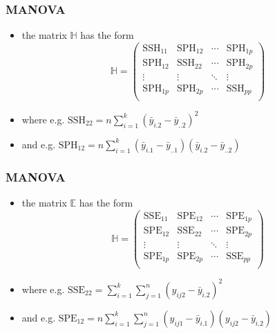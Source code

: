 \begin{frame}\frametitle{MANOVA}
  \begin{itemize}
  \item the matrix $\mathbb{H}$ has the form
    \begin{displaymath}
      \mathbb{H} = \begin{pmatrix} 
        \mathrm{SSH}_{11} & \mathrm{SPH}_{12} & \cdots & \mathrm{SPH}_{1p} \\    
        \mathrm{SPH}_{12} & \mathrm{SSH}_{22} & \cdots & \mathrm{SPH}_{2p} \\    
        \vdots & \vdots & \ddots & \vdots \\    
        \mathrm{SPH}_{1p} & \mathrm{SPH}_{2p} & \cdots & \mathrm{SSH}_{pp} \\    
      \end{pmatrix}
    \end{displaymath}
  \item where e.g. $\mathrm{SSH}_{22} = n \sum_{i=1}^k (\bar{y}_{i.2} - \bar{y}_{..2})^2$
  \item and e.g. $\mathrm{SPH}_{12} = n \sum_{i=1}^k (\bar{y}_{i.1} - \bar{y}_{..1})(\bar{y}_{i.2} - \bar{y}_{..2})$
  \end{itemize}
\end{frame}


\begin{frame}\frametitle{MANOVA}
  \begin{itemize}
  \item the matrix $\mathbb{E}$ has the form
    \begin{displaymath}
      \mathbb{H} = \begin{pmatrix} 
        \mathrm{SSE}_{11} & \mathrm{SPE}_{12} & \cdots & \mathrm{SPE}_{1p} \\    
        \mathrm{SPE}_{12} & \mathrm{SSE}_{22} & \cdots & \mathrm{SPE}_{2p} \\    
        \vdots & \vdots & \ddots & \vdots \\    
        \mathrm{SPE}_{1p} & \mathrm{SPE}_{2p} & \cdots & \mathrm{SSE}_{pp} \\    
      \end{pmatrix}
    \end{displaymath}
  \item where e.g. $\mathrm{SSE}_{22} =  \sum_{i=1}^k \sum_{j=1}^n (y_{ij2} - \bar{y}_{i.2})^2$
  \item and e.g. $\mathrm{SPE}_{12} = n \sum_{i=1}^k \sum_{j=1}^n (y_{ij1} - \bar{y}_{i.1})(y_{ij2} - \bar{y}_{i.2})$
  \end{itemize}
\end{frame}


